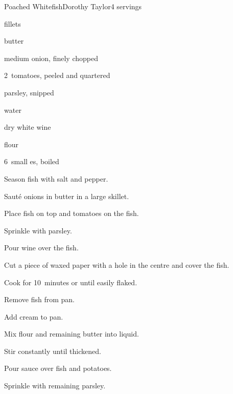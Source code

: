 \begin{recipe}{Poached Whitefish}{Dorothy Taylor}{4 servings}

\begin{ingredients}
\item \lbs{1\threequarter}  fillets
\item {}
\item {}
\item {} butter
\item medium onion, finely chopped
\item 2~tomatoes, peeled and quartered
\item \C{\quarter} parsley, snipped
\item \C{\third} water
\item \C{\third} dry white wine
\item \C{\third} 
\item {} flour
\item 6~small es, boiled
\end{ingredients}

\begin{directions}
\item Season fish with salt and pepper.
\item Saut\'e onions in  butter in a large skillet.
\item Place fish on top and tomatoes on the fish.
\item Sprinkle with  parsley.
\item Pour wine over the fish.
\item Cut a piece of waxed paper with a hole in the centre and  cover the fish.
\item Cook for 10~minutes or until easily flaked.
\item Remove fish from pan.
\item Add cream to pan.
\item Mix flour and remaining butter into liquid.
\item Stir constantly until thickened.
\item Pour sauce over fish and potatoes.
\item Sprinkle with remaining parsley.
\end{directions}

\end{recipe}
